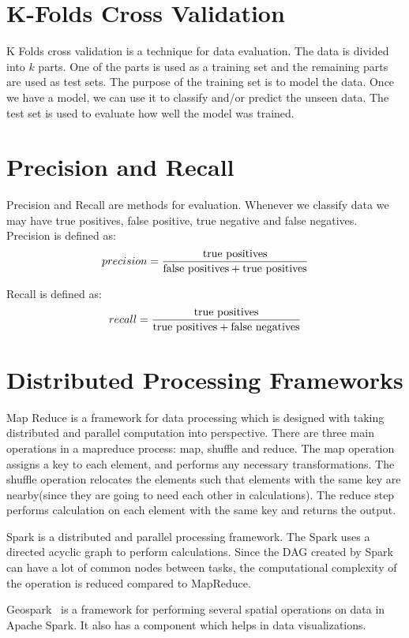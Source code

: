 \section{K-Folds Cross Validation}
K Folds cross validation is a technique for data evaluation\citep{kohavi1995study,refaeilzadeh2009cross}. The data is divided into $k$ parts. One of the parts is used as a training set and the remaining parts are used as test sets. The purpose of the training set is to model the data. Once we have a model, we can use it to classify and/or predict the unseen data. The test set is used to evaluate how well the model was trained.

\section{Precision and Recall}
Precision and Recall are methods for evaluation\citep{olson2008advanced,powers2011evaluation}. Whenever we classify data we may have true positives, false positive, true negative and false negatives. Precision is defined as:
$$precision = \frac{\textnormal{true positives}}{\textnormal{false positives} + \textnormal{true positives}}$$

Recall is defined as:
$$recall = \frac{\textnormal{true positives}}{\textnormal{true positives} + \textnormal{false negatives}}$$

\section{Distributed Processing Frameworks}
Map Reduce\citep{dean2008mapreduce} is a framework for data processing which is designed with taking distributed and parallel computation into perspective. There are three main operations in a mapreduce process: map, shuffle and reduce. The map operation assigns a key to each element, and performs any necessary transformations. The shuffle operation relocates the elements such that elements with the same key are nearby(since they are going to need each other in calculations). The reduce step performs calculation on each element with the same key and returns the output.

Spark\citep{shanahan2015large,zaharia2016apache} is a distributed and parallel processing framework. The Spark uses a directed acyclic graph to perform calculations. Since the DAG created by Spark can have a lot of common nodes between tasks, the computational complexity of the operation is reduced compared to MapReduce.

Geospark~\citep{yu2015geospark} is a framework for performing several spatial operations on data in Apache Spark. It also has a component which helps in data visualizations\citep{yu2018src}.

